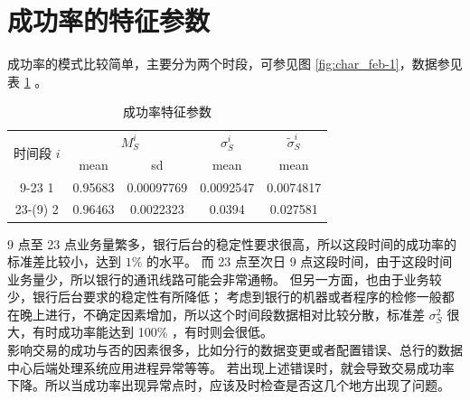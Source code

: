 \documentclass[a4paper]{article}
\begin{document}
\section{成功率的特征参数}
\indent 成功率的模式比较简单，主要分为两个时段，可参见图 \ref{fig:char_feb-1}，数据参见表 \ref{tab:char_S} 。
\begin{table}[H]
	\centering
	\caption{成功率特征参数}
	\label{tab:char_S}
	\begin{tabular}{c|cc|c|c}
		\hline
		\multirow{2}{*}{时间段 $i$} & \multicolumn{2}{c}{$M_S^i$} & $\sigma_S^i$ & $\tilde{\sigma}_S^i$ \\
		& mean        & sd            & mean        & mean                 \\
		\hline
		9-23 1                   & 0.95683     & 0.00097769    & 0.0092547   & 0.0074817            \\
		23-(9) 2                 & 0.96463     & 0.0022323     & 0.0394      & 0.027581            \\
		\hline
	\end{tabular}
\end{table}
9 点至 23 点业务量繁多，银行后台的稳定性要求很高，所以这段时间的成功率的标准差比较小，达到 $1\%$ 的水平。
而 23 点至次日 9 点这段时间，由于这段时间业务量少，所以银行的通讯线路可能会非常通畅。
但另一方面，也由于业务较少，银行后台要求的稳定性有所降低；
考虑到银行的机器或者程序的检修一般都在晚上进行，不确定因素增加，所以这个时间段数据相对比较分散，标准差 $\sigma_S^2$ 很大，有时成功率能达到 100\% ，有时则会很低。
\\
\indent 影响交易的成功与否的因素很多，比如分行的数据变更或者配置错误、总行的数据中心后端处理系统应用进程异常等等。
若出现上述错误时，就会导致交易成功率下降。所以当成功率出现异常点时，应该及时检查是否这几个地方出现了问题。
\end{document}
